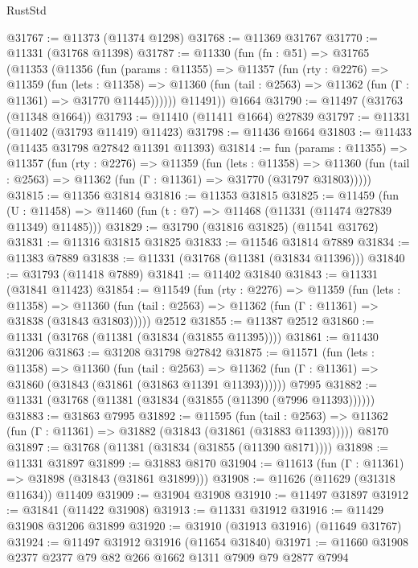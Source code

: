 \begin{lexlean}{RustStd}
\begin{coremodule}
@31767 := @11373 (@11374 @1298)
@31768 := @11369 @31767
@31770 := @11331 (@31768 @11398)
@31787 := @11330
    (fun (fn : @51) =>
    @31765
      (@11353
        (@11356
          (fun (params : @11355) =>
          @11357
            (fun (rty : @2276) =>
            @11359
              (fun (lets : @11358) =>
              @11360 (fun (tail : @2563) => @11362 (fun (Γ : @11361) => @31770 @11445))))))
        @11491))
    @1664
@31790 := @11497 (@31763 (@11348 @1664))
@31793 := @11410 (@11411 @1664) @27839
@31797 := @11331 (@11402 (@31793 @11419) @11423)
@31798 := @11436 @1664
@31803 := @11433 (@11435 @31798 @27842 @11391 @11393)
@31814 := fun (params : @11355) =>
  @11357
    (fun (rty : @2276) =>
    @11359
      (fun (lets : @11358) =>
      @11360 (fun (tail : @2563) => @11362 (fun (Γ : @11361) => @31770 (@31797 @31803)))))
@31815 := @11356 @31814
@31816 := @11353 @31815
@31825 := @11459
    (fun (U : @11458) => @11460 (fun (t : @7) => @11468 (@11331 (@11474 @27839 @11349) @11485)))
@31829 := @31790 (@31816 @31825) (@11541 @31762)
@31831 := @11316 @31815 @31825
@31833 := @11546 @31814 @7889
@31834 := @11383 @7889
@31838 := @11331 (@31768 (@11381 (@31834 @11396)))
@31840 := @31793 (@11418 @7889)
@31841 := @11402 @31840
@31843 := @11331 (@31841 @11423)
@31854 := @11549
    (fun (rty : @2276) =>
    @11359
      (fun (lets : @11358) =>
      @11360 (fun (tail : @2563) => @11362 (fun (Γ : @11361) => @31838 (@31843 @31803)))))
    @2512
@31855 := @11387 @2512
@31860 := @11331 (@31768 (@11381 (@31834 (@31855 @11395))))
@31861 := @11430 @31206
@31863 := @31208 @31798 @27842
@31875 := @11571
    (fun (lets : @11358) =>
    @11360
      (fun (tail : @2563) =>
      @11362 (fun (Γ : @11361) => @31860 (@31843 (@31861 (@31863 @11391 @11393))))))
    @7995
@31882 := @11331 (@31768 (@11381 (@31834 (@31855 (@11390 (@7996 @11393))))))
@31883 := @31863 @7995
@31892 := @11595
    (fun (tail : @2563) => @11362 (fun (Γ : @11361) => @31882 (@31843 (@31861 (@31883 @11393)))))
    @8170
@31897 := @31768 (@11381 (@31834 (@31855 (@11390 @8171))))
@31898 := @11331 @31897
@31899 := @31883 @8170
@31904 := @11613 (fun (Γ : @11361) => @31898 (@31843 (@31861 @31899)))
@31908 := @11626 (@11629 (@31318 @11634)) @11409
@31909 := @31904 @31908
@31910 := @11497 @31897
@31912 := @31841 (@11422 @31908)
@31913 := @11331 @31912
@31916 := @11429 @31908 @31206 @31899
@31920 := @31910 (@31913 @31916) (@11649 @31767)
@31924 := @11497 @31912 @31916 (@11654 @31840)
@31971 := @11660
    @31908
    @2377
    @2377
    @79
    @82
    @266
    @1662
    @1311
    @7909
    @79
    @2877
    @7994

\end{coremodule}
\end{lexlean}
